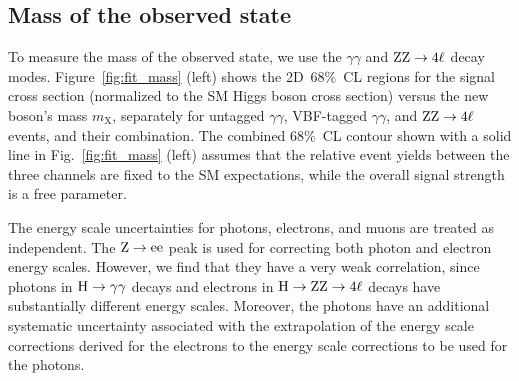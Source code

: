 \documentclass[11pt,twoside,a4paper,cmspaper,final,collab]{cms-tdr}
\begin{document}
\subsection{Mass of the observed state}

To measure the mass of the observed state,
we use the $\gamma\gamma$ and $\mathrm{Z}\mathrm{Z} \to 4\ell$ decay modes.
Figure~\ref{fig:fit_mass} (left) shows
the 2D~68\%~CL regions for
the signal cross section (normalized to the SM Higgs boson cross section) versus the new boson's mass $m_{\mathrm{X}}$, separately for
untagged $\gamma\gamma$, VBF-tagged $\gamma\gamma$, and $\mathrm{Z}\mathrm{Z} \to 4\ell$ events, and their combination.
The combined 68\%~CL contour shown with a solid line in Fig.~\ref{fig:fit_mass} (left)
assumes that the relative event yields between the three channels are fixed to the SM expectations,
while the overall signal strength is a free parameter.

The energy scale uncertainties for photons, electrons, and muons are treated as independent.
The $\mathrm{Z} \to \mathrm{e}\mathrm{e}$ peak is used for correcting both photon and electron energy scales. However,
we find that they have a very weak correlation, since photons in $\mathrm{H} \to \gamma\gamma$
decays and electrons in $\mathrm{H} \to \mathrm{Z}\mathrm{Z} \to 4\ell$ decays have substantially different energy scales.
Moreover, the photons have an additional systematic uncertainty associated with the extrapolation
of the energy scale corrections derived for the electrons to the energy scale corrections
to be used for the photons.
\end{document}

